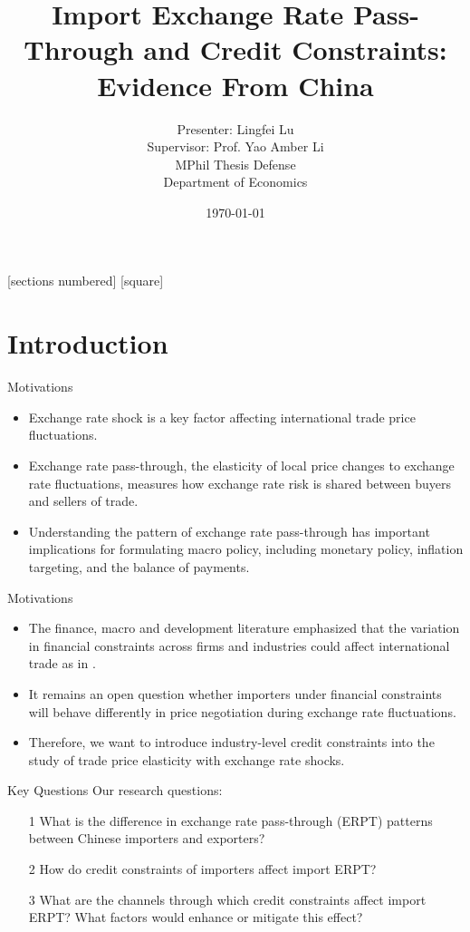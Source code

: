 \documentclass[10pt]{beamer}
\title[MPhil Thesis]{Import Exchange Rate Pass-Through and Credit Constraints: Evidence From China}
\author[Lingfei Lu]{\large Presenter: Lingfei Lu \\ \vspace{0.4cm} Supervisor: Prof. Yao Amber Li\\ \vspace{0.4cm} MPhil Thesis Defense \\ \vspace{0.4cm} Department of Economics}
\date{\today}
\begin{document}
	
\begin{frame}[plain]
	\maketitle {}
\end{frame}


[sections numbered] 
[square] 

\section{Introduction}

\begin{frame}{Motivations}
	\begin{itemize}
		\item Exchange rate shock is a key factor affecting international trade price fluctuations.
		\item Exchange rate pass-through, the elasticity of local price changes to exchange rate fluctuations, measures how exchange rate risk is shared between buyers and sellers of trade.
		\item Understanding the pattern of exchange rate pass-through has important implications for formulating macro policy, including monetary policy, inflation targeting, and the balance of payments.
	\end{itemize}
\end{frame}

\begin{frame}{Motivations}
	\begin{itemize}
		\item The finance, macro and development literature emphasized that the variation in financial constraints across firms and industries could affect international trade as in \cite{manova2013}.
		\item It remains an open question whether importers under financial constraints will behave differently in price negotiation during exchange rate fluctuations.
		\item Therefore, we want to introduce industry-level credit constraints into the study of trade price elasticity with exchange rate shocks.
	\end{itemize}
\end{frame}

\begin{frame}{Key Questions}
Our research questions:
	\begin{itemize}
		\item [1] What is the difference in exchange rate pass-through (ERPT) patterns between Chinese importers and exporters?
		\item [2] How do credit constraints of importers affect import ERPT?
		\item [3] What are the channels through which credit constraints affect import ERPT? What factors would enhance or mitigate this effect?
	\end{itemize}
\end{frame}
\end{document}
